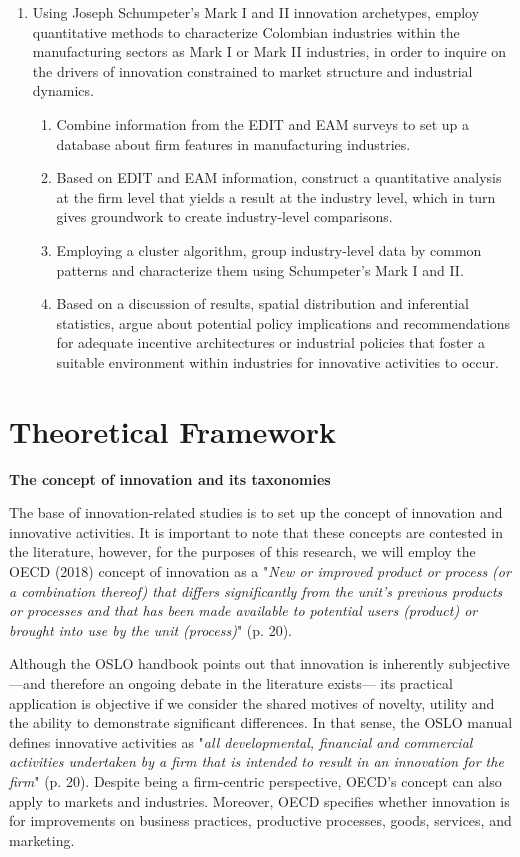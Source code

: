\documentclass[12pt,a4paper]{article}
\begin{document}
\begin{enumerate}
	\item \large Using Joseph Schumpeter’s Mark I and II innovation archetypes, employ quantitative methods to characterize Colombian industries within the manufacturing sectors as Mark I or Mark II industries, in order to inquire on the drivers of innovation constrained to market structure and industrial dynamics.
\begin{enumerate}
	\item \normalsize Combine information from the EDIT and EAM surveys to set up a database about firm features in manufacturing industries.
	\item Based on EDIT and EAM information, construct a quantitative analysis at the firm level that yields a result at the industry level, which in turn gives groundwork to create industry-level comparisons.
	\item Employing a cluster algorithm, group industry-level data by common patterns and characterize them using Schumpeter's Mark I and II.
	\item Based on a discussion of results, spatial distribution and inferential statistics, argue about potential policy implications and recommendations for adequate incentive architectures or industrial policies that foster a suitable environment within industries for innovative activities to occur.
\end{enumerate}
\end{enumerate}

\pagebreak

\section{Theoretical Framework}

\textbf{The concept of innovation and its taxonomies }

The base of innovation-related studies is to set up the concept of innovation and innovative activities. It is important to note that these concepts are contested in the literature, however, for the purposes of this research, we will employ the OECD (2018) concept of innovation as a "\textit{New or improved product or process (or a combination thereof) that differs significantly from the unit's previous products or processes and that has been made available to potential users (product) or brought into use by the unit (process)}" (p. 20).  

Although the OSLO handbook points out that innovation is inherently subjective —and therefore an ongoing debate in the literature exists— its practical application is objective if we consider the shared motives of novelty, utility and the ability to demonstrate significant differences. In that sense, the OSLO manual defines innovative activities as "\textit{all developmental, financial and commercial activities undertaken by a firm that is intended to result in an innovation for the firm}" (p. 20). Despite being a firm-centric perspective, OECD's concept can also apply to markets and industries. Moreover, OECD specifies whether innovation is for improvements on business practices, productive processes, goods, services, and marketing.  
\end{document}
